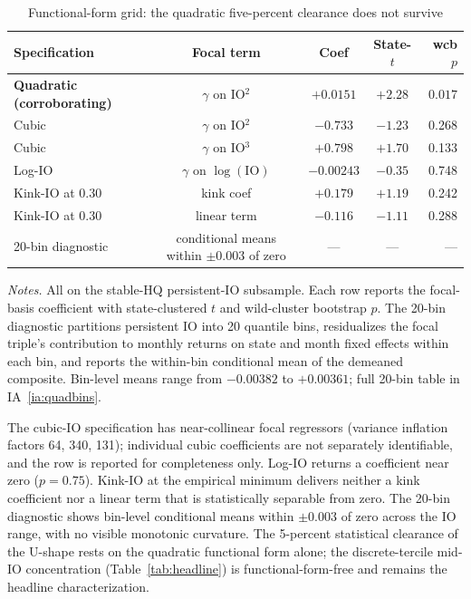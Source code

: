 \begin{table}[t]
\centering
\caption{Functional-form grid: the quadratic five-percent clearance does not survive}
\label{tab:form_grid}
\footnotesize
\begin{minipage}{\textwidth}
\centering
\begin{tabular}{lcccr}
\toprule
Specification & Focal term & Coef & State-$t$ & wcb $p$ \\
\midrule
\textbf{Quadratic (corroborating)} & $\gamma$ on IO$^{2}$ & $\mathbf{+0.0151}$ & $\mathbf{+2.28}$ & $\mathbf{0.017}$ \\
Cubic & $\gamma$ on IO$^{2}$ & $-0.733$ & $-1.23$ & 0.268 \\
Cubic & $\gamma$ on IO$^{3}$ & $+0.798$ & $+1.70$ & 0.133 \\
Log-IO & $\gamma$ on $\log(\mathrm{IO})$ & $-0.00243$ & $-0.35$ & 0.748 \\
Kink-IO at 0.30 & kink coef & $+0.179$ & $+1.19$ & 0.242 \\
Kink-IO at 0.30 & linear term & $-0.116$ & $-1.11$ & 0.288 \\
20-bin diagnostic & conditional means within $\pm 0.003$ of zero & --- & --- & --- \\
\bottomrule
\end{tabular}
\end{minipage}

\medskip
{\footnotesize\textit{Notes.} All on the stable-HQ persistent-IO subsample. Each row reports the focal-basis coefficient with state-clustered $t$ and wild-cluster bootstrap $p$. The 20-bin diagnostic partitions persistent IO into 20 quantile bins, residualizes the focal triple's contribution to monthly returns on state and month fixed effects within each bin, and reports the within-bin conditional mean of the demeaned composite. Bin-level means range from $-0.00382$ to $+0.00361$; full 20-bin table in IA~\ref{ia:quadbins}.}
\end{table}

The cubic-IO specification has near-collinear focal regressors (variance inflation factors 64, 340, 131); individual cubic coefficients are not separately identifiable, and the row is reported for completeness only. Log-IO returns a coefficient near zero ($p = 0.75$). Kink-IO at the empirical minimum delivers neither a kink coefficient nor a linear term that is statistically separable from zero. The 20-bin diagnostic shows bin-level conditional means within $\pm 0.003$ of zero across the IO range, with no visible monotonic curvature. The 5-percent statistical clearance of the U-shape rests on the quadratic functional form alone; the discrete-tercile mid-IO concentration (Table~\ref{tab:headline}) is functional-form-free and remains the headline characterization.

